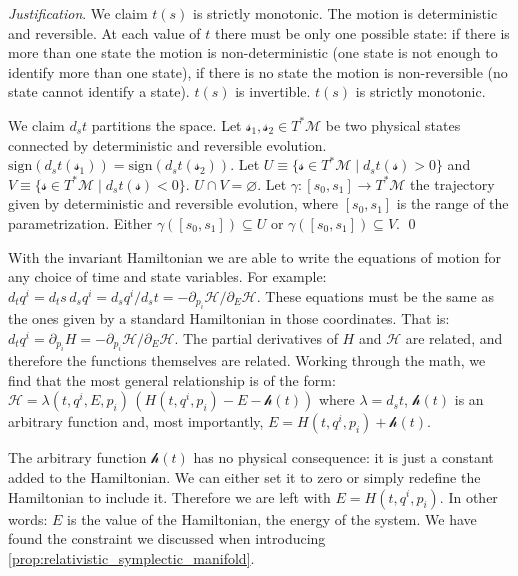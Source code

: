 \documentclass[aps,pra,10pt,twocolumn,floatfix,nofootinbib]{revtex4-1}
\numberwithin{equation}{section}
\theoremstyle{definition}
\newenvironment{justification}{\emph{Justification}.}{\qed}
\begin{document}
\begin{justification}
	We claim $t(s)$ is strictly monotonic. The motion is deterministic and reversible. At each value of $t$ there must be only one possible state: if there is more than one state the motion is non-deterministic (one state is not enough to identify more than one state), if there is no state the motion is non-reversible (no state cannot identify a state). $t(s)$ is invertible. $t(s)$ is strictly monotonic.
	
	We claim $d_{s}t$ partitions the space. Let $\mathcal{s}_1, \mathcal{s}_2 \in T^*\mathcal{M}$ be two physical states connected by deterministic and reversible evolution. $\mathrm{sign}(d_{s}t(\mathcal{s}_1)) = \mathrm{sign}(d_{s}t(\mathcal{s}_2))$. Let $U \equiv \{\mathcal{s} \in T^*\mathcal{M} \; | \; d_{s}t(\mathcal{s}) > 0 \}$ and $V \equiv \{\mathcal{s} \in T^*\mathcal{M} \; | \; d_{s}t(\mathcal{s}) < 0 \}$. $U \cap V = \varnothing$. Let $\gamma : [s_0, s_1] \rightarrow T^*\mathcal{M}$ the trajectory given by deterministic and reversible evolution, where $[s_0, s_1]$ is the range of the parametrization. Either $\gamma([s_0, s_1]) \subseteq U$ or $\gamma([s_0, s_1]) \subseteq V$.
\end{justification}

With the invariant Hamiltonian we are able to write the equations of motion for any choice of time and state variables. For example: $d_t q^i = d_t s \, d_s q^i = d_s q^i / d_s t = - \partial_{p_i} \mathcal{H} / \partial_{E} \mathcal{H}$. These equations must be the same as the ones given by a standard Hamiltonian in those coordinates. That is: $d_t q^i = \partial_{p_i} H = - \partial_{p_i} \mathcal{H} / \partial_{E} \mathcal{H}$. The partial derivatives of $H$ and $\mathcal{H}$ are related, and therefore the functions themselves are related. Working through the math, we find that the most general relationship is of the form: $\mathcal{H} = \lambda(t,q^i,E,p_i) \, (H(t,q^i,p_i) - E - \mathcal{h}(t))$ where $\lambda = d_s t$, $\mathcal{h}(t)$ is an arbitrary function and, most importantly, $E = H(t,q^i,p_i) + \mathcal{h}(t)$.

The arbitrary function $\mathcal{h}(t)$ has no physical consequence: it is just a constant added to the Hamiltonian. We can either set it to zero or simply redefine the Hamiltonian to include it. Therefore we are left with $E = H(t,q^i,p_i)$. In other words: $E$ is the value of the Hamiltonian, the energy of the system. We have found the constraint we discussed when introducing \ref{prop:relativistic_symplectic_manifold}.
\end{document}

